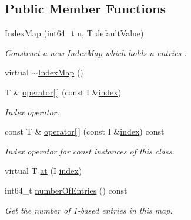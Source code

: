 \subsection*{Public Member Functions}
\begin{DoxyCompactItemize}
\item 
\hyperlink{class_ensemble_clustering_1_1_index_map_a475e833d787f15cb3ea392d2a986af3b}{Index\-Map} (int64\-\_\-t \hyperlink{class_ensemble_clustering_1_1_index_map_a3151d302c54e6ad0175bd87aef62d4ca}{n}, T \hyperlink{class_ensemble_clustering_1_1_index_map_ab5f1dc778237131e9d6c5713c2b318ec}{default\-Value})
\begin{DoxyCompactList}\small\item\em Construct a new \hyperlink{class_ensemble_clustering_1_1_index_map}{Index\-Map} which holds n entries . \end{DoxyCompactList}\item 
virtual \hyperlink{class_ensemble_clustering_1_1_index_map_aa4d08669a9bc3863b01f924c8d115328}{$\sim$\-Index\-Map} ()
\item 
T \& \hyperlink{class_ensemble_clustering_1_1_index_map_a961b55c469821e1a66cbdb1113a10f22}{operator\mbox{[}$\,$\mbox{]}} (const I \&\hyperlink{namespace_ensemble_clustering_a1ba11e6d628873b803a26fe054f45e28}{index})
\begin{DoxyCompactList}\small\item\em Index operator. \end{DoxyCompactList}\item 
const T \& \hyperlink{class_ensemble_clustering_1_1_index_map_afa664fe610c7cd8871125ba041bb9374}{operator\mbox{[}$\,$\mbox{]}} (const I \&\hyperlink{namespace_ensemble_clustering_a1ba11e6d628873b803a26fe054f45e28}{index}) const 
\begin{DoxyCompactList}\small\item\em Index operator for const instances of this class. \end{DoxyCompactList}\item 
virtual T \hyperlink{class_ensemble_clustering_1_1_index_map_ac3cb340d385ef58e348f16038017fc3a}{at} (I \hyperlink{namespace_ensemble_clustering_a1ba11e6d628873b803a26fe054f45e28}{index})
\item 
int64\-\_\-t \hyperlink{class_ensemble_clustering_1_1_index_map_a53354adcfc7081e8c3bc82e9f5c632a1}{number\-Of\-Entries} () const 
\begin{DoxyCompactList}\small\item\em Get the number of 1-\/based entries in this map. \end{DoxyCompactList}\item 

\end{DoxyCompactItemize}

